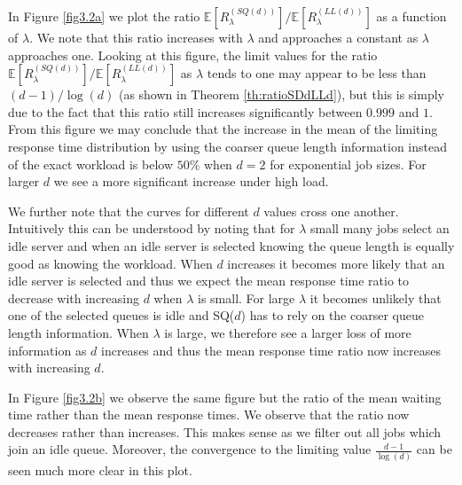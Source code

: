 \documentclass[12pt]{report}
\newcommand{\E}{\mathbb{E}}
\begin{document}
In Figure \ref{fig3.2a} we plot the ratio $\E\left[R^{(SQ(d))}_\lambda\right]/\E\left[R^{(LL(d))}_\lambda\right]$ as a function
of $\lambda$. We note that this ratio  increases with $\lambda$ and approaches a constant as
$\lambda$ approaches one. Looking at this figure, the limit values for the ratio $\E\left[R^{(SQ(d))}_\lambda\right]/\E\left[R^{(LL(d))}_\lambda\right]$ 
as $\lambda$ tends to one may appear to be less than $(d-1)/\log(d)$ (as shown in Theorem \ref{th:ratioSDdLLd}), 
but this is simply due to the fact
that this ratio still increases significantly between $0.999$ and $1$.
From this figure we may conclude that the increase in the mean of the limiting response time distribution
by using the coarser queue length information instead of the exact workload is below $50\%$ when $d=2$
for exponential job sizes. For larger $d$ we see a more significant increase under high load.

We further note that the curves for different $d$ values cross one another. 
Intuitively this can be understood
by noting that for $\lambda$ small many jobs select an idle server and when an idle server is selected
knowing the queue length is equally good as knowing the workload. When $d$ increases it becomes more likely that an idle server is
selected and thus we expect the mean response time ratio to decrease with increasing $d$ when $\lambda$ is small. 
For large $\lambda$ it becomes unlikely that one of the selected queues is idle and SQ($d$) has to rely
on the coarser queue length information. When $\lambda$ is large, we therefore
see a larger loss of more information as $d$ increases and thus the  mean response time ratio now increases with increasing $d$.

In Figure \ref{fig3.2b} we observe the same figure but the ratio of the mean waiting time rather than the mean response times. We observe that the ratio now decreases rather than increases. This makes sense as we filter out all jobs which join an idle queue. Moreover, the convergence to the limiting value $\frac{d-1}{\log(d)}$ can be seen much more clear in this plot.
\end{document}
